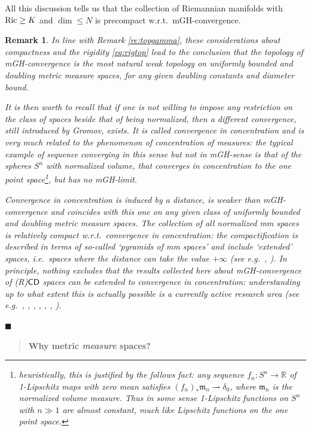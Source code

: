 \documentclass[11pt]{article}
\numberwithin{equation}{section}
\newtheorem{remark}[theorem]{Remark}
\newcommand{\R}{\mathbb{R}}
\newcommand{\mm}{{\mathfrak m}}
\newcommand{\CD}{{\sf CD}}
\newcommand{\weakto}{\rightharpoonup}
\newcommand{\fr}{\penalty-20\null\hfill$\blacksquare$}         %
\begin{document}
All this discussion tells us that the collection of Riemannian manifolds with   ${\rm Ric}\geq K$ and $\dim\leq N$ is precompact w.r.t.\ mGH-convergence.

\begin{remark}{\rm In line with Remark \ref{re:topgamma}, these considerations about compactness and the rigidity \eqref{eq:rigtop} lead to the conclusion that the topology of mGH-convergence is the most natural weak topology on uniformly bounded and doubling metric measure spaces, for any given doubling constants and diameter bound.

It is then worth to recall that if one is not willing to impose any restriction on the class of spaces beside that of being normalized, then a different convergence, still introduced by Gromov, exists. It is called convergence in concentration and is very much related to the phenomenon of concentration of measures: the typical example of sequence converging in this sense but not in mGH-sense is that of the spheres $S^n$ with normalized volume, that converges in concentration to the one point space\footnote{heuristically, this is justified by the follows fact: any sequence $f_n:S^n\to\R$ of 1-Lipschitz maps with zero mean satisfies $(f_n)_*\mm_n\weakto\delta_0$, where $\mm_n$ is the normalized volume measure. Thus in some sense 1-Lipschitz functions on $S^n$ with $n\gg1$ are almost constant, much like Lipschitz functions on the one point space.}, but has no mGH-limit.

Convergence in concentration is induced by a distance, is weaker than mGH-convergence and coincides with this one on any given class of uniformly bounded and doubling metric measure spaces. The collection of all normalized mm spaces is relatively compact w.r.t.\ convergence in concentration: the compactification is described in terms of so-called `pyramids of mm spaces' and include `extended' spaces, i.e.\ spaces where the  distance can take the value $+\infty$ (see e.g.\ \cite{Shi16}, \cite{Shi17}). In principle, nothing excludes that the results collected here about mGH-convergence of ({\sf R})$\CD$ spaces can be extended to convergence in concentration: understanding up to what extent this is actually possible is a currently active research area (see e.g.\ \cite{OzaShi14}, \cite{OzaYok19}, \cite{KazShi20}, \cite{NakShi21}, \cite{NakShi21-2}, \cite{KazYok21}, \cite{KazYok22}).
}\fr\end{remark}
\begin{quote}
{\bf Why metric \emph{measure} spaces?}
\end{quote}
\end{document}
